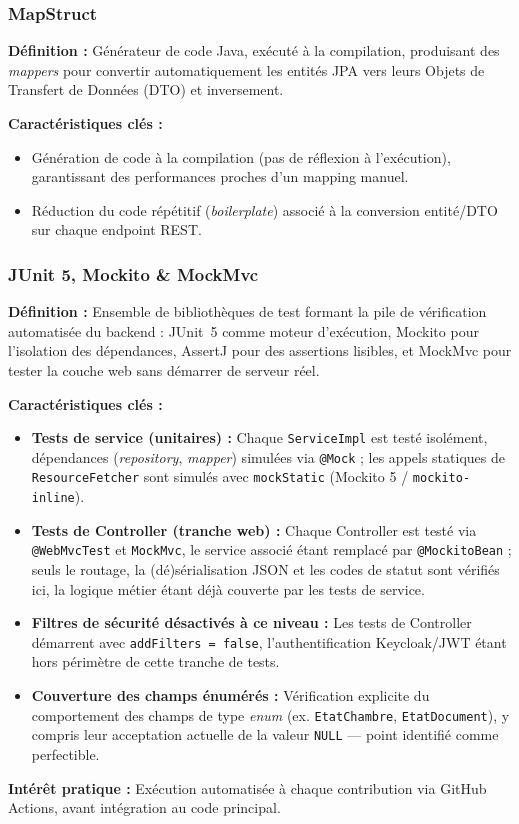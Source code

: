 \documentclass[a4paper,12pt]{article}
\begin{document}
\subsubsection{MapStruct}
\textbf{Définition :} Générateur de code Java, exécuté à la compilation, produisant des \textit{mappers} pour convertir automatiquement les entités JPA vers leurs Objets de Transfert de Données (DTO) et inversement.

\textbf{Caractéristiques clés :}
\begin{itemize}[label=$\bullet$]
    \item Génération de code à la compilation (pas de réflexion à l'exécution), garantissant des performances proches d'un mapping manuel.
    \item Réduction du code répétitif (\textit{boilerplate}) associé à la conversion entité/DTO sur chaque endpoint REST.
\end{itemize}

\subsubsection{JUnit 5, Mockito \& MockMvc}
\textbf{Définition :} Ensemble de bibliothèques de test formant la pile de vérification automatisée du backend : JUnit~5 comme moteur d'exécution, Mockito pour l'isolation des dépendances, AssertJ pour des assertions lisibles, et MockMvc pour tester la couche web sans démarrer de serveur réel.

\textbf{Caractéristiques clés :}
\begin{itemize}[label=$\bullet$]
    \item \textbf{Tests de service (unitaires) :} Chaque \texttt{ServiceImpl} est testé isolément, dépendances (\textit{repository}, \textit{mapper}) simulées via \texttt{@Mock} ; les appels statiques de \texttt{ResourceFetcher} sont simulés avec \texttt{mockStatic} (Mockito 5 / \texttt{mockito-inline}).
    \item \textbf{Tests de Controller (tranche web) :} Chaque Controller est testé via \texttt{@WebMvcTest} et \texttt{MockMvc}, le service associé étant remplacé par \texttt{@MockitoBean} ; seuls le routage, la (dé)sérialisation JSON et les codes de statut sont vérifiés ici, la logique métier étant déjà couverte par les tests de service.
    \item \textbf{Filtres de sécurité désactivés à ce niveau :} Les tests de Controller démarrent avec \texttt{addFilters = false}, l'authentification Keycloak/JWT étant hors périmètre de cette tranche de tests.
    \item \textbf{Couverture des champs énumérés :} Vérification explicite du comportement des champs de type \textit{enum} (ex. \texttt{EtatChambre}, \texttt{EtatDocument}), y compris leur acceptation actuelle de la valeur \texttt{NULL} — point identifié comme perfectible.
\end{itemize}
\textbf{Intérêt pratique :} Exécution automatisée à chaque contribution via GitHub Actions, avant intégration au code principal.
\end{document}
